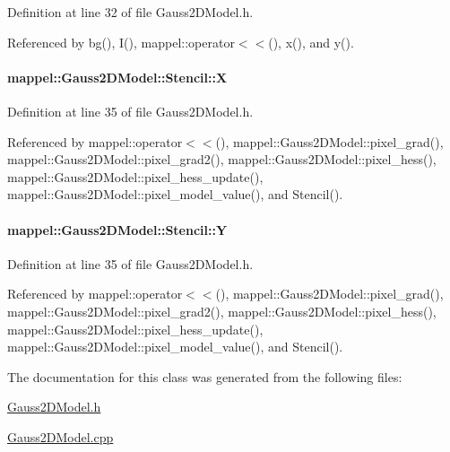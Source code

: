 Definition at line 32 of file Gauss2\+D\+Model.\+h.



Referenced by bg(), I(), mappel\+::operator$<$$<$(), x(), and y().

\paragraph[{\texorpdfstring{X}{X}}]{ mappel\+::\+Gauss2\+D\+Model\+::\+Stencil\+::X}\hypertarget{classmappel_1_1Gauss2DModel_1_1Stencil_a09ecf63ea4e36b797ac9d132e2f0e5a2}{}\label{classmappel_1_1Gauss2DModel_1_1Stencil_a09ecf63ea4e36b797ac9d132e2f0e5a2}


Definition at line 35 of file Gauss2\+D\+Model.\+h.



Referenced by mappel\+::operator$<$$<$(), mappel\+::\+Gauss2\+D\+Model\+::pixel\+\_\+grad(), mappel\+::\+Gauss2\+D\+Model\+::pixel\+\_\+grad2(), mappel\+::\+Gauss2\+D\+Model\+::pixel\+\_\+hess(), mappel\+::\+Gauss2\+D\+Model\+::pixel\+\_\+hess\+\_\+update(), mappel\+::\+Gauss2\+D\+Model\+::pixel\+\_\+model\+\_\+value(), and Stencil().

\paragraph[{\texorpdfstring{Y}{Y}}]{ mappel\+::\+Gauss2\+D\+Model\+::\+Stencil\+::Y}\hypertarget{classmappel_1_1Gauss2DModel_1_1Stencil_a83c1e9cdd33070a4c88bc0513eb569d7}{}\label{classmappel_1_1Gauss2DModel_1_1Stencil_a83c1e9cdd33070a4c88bc0513eb569d7}


Definition at line 35 of file Gauss2\+D\+Model.\+h.



Referenced by mappel\+::operator$<$$<$(), mappel\+::\+Gauss2\+D\+Model\+::pixel\+\_\+grad(), mappel\+::\+Gauss2\+D\+Model\+::pixel\+\_\+grad2(), mappel\+::\+Gauss2\+D\+Model\+::pixel\+\_\+hess(), mappel\+::\+Gauss2\+D\+Model\+::pixel\+\_\+hess\+\_\+update(), mappel\+::\+Gauss2\+D\+Model\+::pixel\+\_\+model\+\_\+value(), and Stencil().



The documentation for this class was generated from the following files\+:\begin{DoxyCompactItemize}
\item 
\hyperlink{Gauss2DModel_8h}{Gauss2\+D\+Model.\+h}\item 
\hyperlink{Gauss2DModel_8cpp}{Gauss2\+D\+Model.\+cpp}\end{DoxyCompactItemize}
